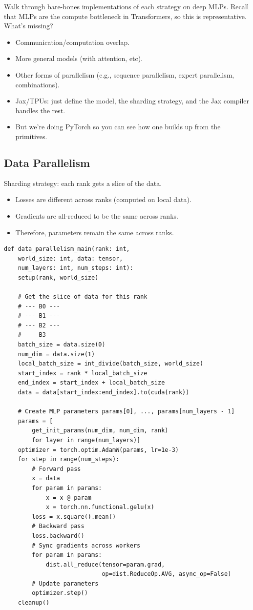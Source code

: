 \documentclass[12pt,twoside]{article}
\begin{document}
Walk through bare-bones implementations of each strategy on deep MLPs. Recall that MLPs are the compute bottleneck in Transformers, so this is representative. \\

What's missing?

\begin{itemize}
    \item Communication/computation overlap.
    \item More general models (with attention, etc).
    \item Other forms of parallelism (e.g., sequence parallelism, expert parallelism, combinations).
    \item Jax/TPUs: just define the model, the sharding strategy, and the Jax compiler handles the rest.
    \item But we're doing PyTorch so you can see how one builds up from the primitives.
\end{itemize}

\subsection*{Data Parallelism}

Sharding strategy: each rank gets a slice of the data.

\begin{itemize}
    \item Losses are different across ranks (computed on local data).
    \item Gradients are all-reduced to be the same across ranks.
    \item Therefore, parameters remain the same across ranks.
\end{itemize}

\begin{verbatim}
def data_parallelism_main(rank: int, 
    world_size: int, data: tensor, 
    num_layers: int, num_steps: int):
    setup(rank, world_size)  
    
    # Get the slice of data for this rank
    # --- B0 ---
    # --- B1 ---
    # --- B2 ---
    # --- B3 ---
    batch_size = data.size(0)  
    num_dim = data.size(1)  
    local_batch_size = int_divide(batch_size, world_size)  
    start_index = rank * local_batch_size  
    end_index = start_index + local_batch_size  
    data = data[start_index:end_index].to(cuda(rank))
    
    # Create MLP parameters params[0], ..., params[num_layers - 1]
    params = [
        get_init_params(num_dim, num_dim, rank) 
        for layer in range(num_layers)]
    optimizer = torch.optim.AdamW(params, lr=1e-3)
    for step in range(num_steps):
        # Forward pass
        x = data
        for param in params:
            x = x @ param
            x = torch.nn.functional.gelu(x)
        loss = x.square().mean()
        # Backward pass
        loss.backward()
        # Sync gradients across workers
        for param in params:
            dist.all_reduce(tensor=param.grad, 
                            op=dist.ReduceOp.AVG, async_op=False)            
        # Update parameters
        optimizer.step()
    cleanup()      
\end{verbatim}
\end{document}
